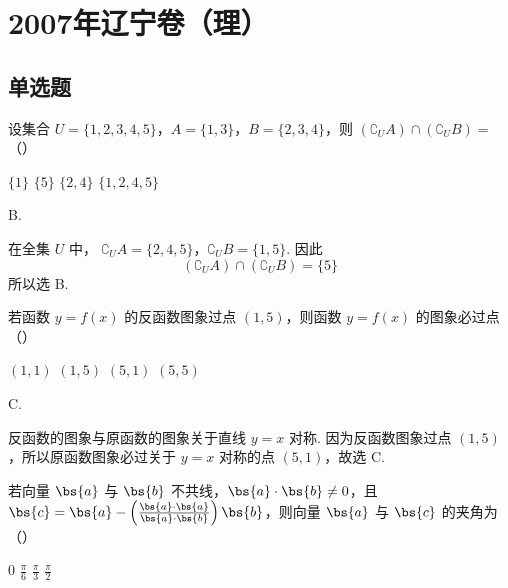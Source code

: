 \chapter{2007年辽宁卷（理）}

\section{单选题}

\begin{problem}
设集合 \(U = \{1, 2, 3, 4, 5\}\)，\(A = \{1, 3\}\)，\(B = \{2, 3, 4\}\)，则 \((\complement_U A) \cap (\complement_U B) =\)（\quad）

\choices
    {\(\{1\}\)}
    {\(\{5\}\)}
    {\(\{2,4\}\)}
    {\(\{1, 2, 4, 5\}\)}
\end{problem}

\begin{answer}
B.
\end{answer}

\begin{solution}
在全集 \(U\) 中，
\(\complement_U A=\{2,4,5\}\)，\(\complement_U B=\{1,5\}\).
因此
\[
(\complement_U A)\cap(\complement_U B)=\{5\}
\]
所以选 B.
\end{solution}

\begin{problem}
若函数 \( y = f(x) \) 的反函数图象过点 \((1,5)\)，则函数 \( y = f(x) \) 的图象必过点（\quad）

\choices
    {\((1,1)\)}
    {\((1,5)\)}
    {\((5,1)\)}
    {\((5,5)\)}
\end{problem}

\begin{answer}
C.
\end{answer}

\begin{solution}
反函数的图象与原函数的图象关于直线 \(y=x\) 对称. 因为反函数图象过点 \((1,5)\)，所以原函数图象必过关于 \(y=x\) 对称的点 \((5,1)\)，故选 C.
\end{solution}


\begin{problem}
若向量 \(\bs{a}\) 与 \(\bs{b}\) 不共线，\(\bs{a} \cdot \bs{b} \neq 0\)，且 \(\bs{c} = \bs{a} - \left(\frac{\bs{a} \cdot \bs{a}}{\bs{a} \cdot \bs{b}}\right)\bs{b}\)，则向量 \(\bs{a}\) 与 \(\bs{c}\) 的夹角为（\quad）

\choices
    {\(0\)}
    {\(\frac{\pi}{6}\)}
    {\(\frac{\pi}{3}\)}
    {\(\frac{\pi}{2}\)}
\end{problem}

